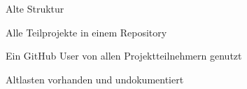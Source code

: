 \begin{frame}
Alte Struktur
\begin{block}{}
	Alle Teilprojekte in einem Repository
\end{block}
\begin{block}{}
	Ein GitHub User von allen Projektteilnehmern genutzt
\end{block}
\begin{block}{}
	Altlasten vorhanden und undokumentiert
\end{block}
\end{frame}